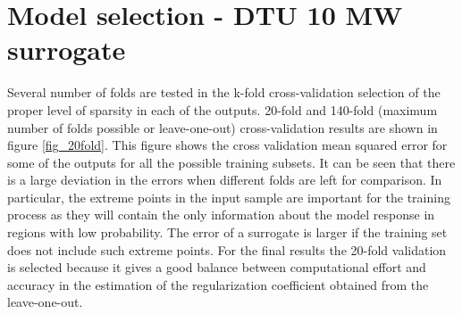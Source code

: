 \documentclass[preprint,12pt]{elsarticle}
\begin{document}
\appendix
\section{Model selection - DTU 10 MW surrogate}

Several number of folds are tested in the k-fold cross-validation selection of the proper level of sparsity in each of the outputs. 20-fold and 140-fold (maximum number of folds possible or leave-one-out) cross-validation results are shown in figure \ref{fig_20fold}. This figure shows the cross validation mean squared error for some of the outputs for all the possible training subsets. It can be seen that there is a large deviation in the errors when different folds are left for comparison. In particular, the extreme points in the input sample are important for the training process as they will contain the only information about the model response in regions with low probability. The error of a surrogate is larger if the training set does not include such extreme points. For the final results the 20-fold validation is selected because it gives a good balance between computational effort and accuracy in the estimation of the regularization coefficient obtained from the leave-one-out.
\end{document}
